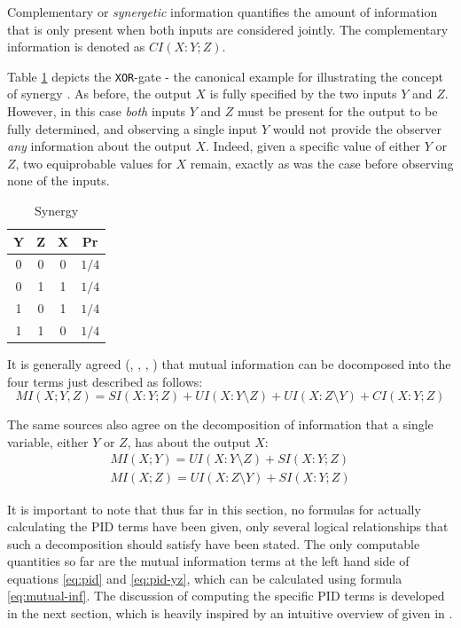 \documentclass[12pt]{article}
\begin{document}
Complementary or \textit{synergetic} information quantifies the amount of information that is only present when both inputs are considered jointly. The complementary information is denoted as $CI(X:Y;Z)$. 

Table \ref{table:3} depicts the \texttt{XOR}-gate - the canonical example for illustrating the concept of synergy \cite{pid-synergy}. As before, the output $X$ is fully specified by the two inputs $Y$ and $Z$. However, in this case \textit{both} inputs $Y$ and $Z$ must be present for the output to be fully determined, and observing a single input $Y$ would not provide the observer \textit{any} information about the output $X$. Indeed, given a specific value of either $Y$ or $Z$, two equiprobable values for $X$ remain, exactly as was the case before observing none of the inputs. 

\begin{table}[h!]
\centering
\begin{tabular}{|c c |c|c|}
	\hline
	Y & Z & X & Pr\\ 
	\hline
	0 & 0 & 0 & $1/4$ \\
	0 & 1 & 1 & $1/4$ \\ 
	1 & 0 & 1 & $1/4$ \\ 
	1 & 1 & 0 & $1/4$ \\ 
	\hline
\end{tabular}
\caption{Synergy}
\label{table:3}
\end{table}

It is generally agreed (\cite{williams-beer}, \cite{bertschinger}, \cite{pid-redundant}, \cite{pid-synergy}) that mutual information can be docomposed into the four terms just described as follows:
\begin{equation}
MI(X;Y,Z) = SI(X:Y;Z) + UI(X:Y \setminus Z) + UI(X:Z \setminus Y) + CI(X:Y;Z)
\label{eq:pid}
\end{equation}

The same sources also agree on the decomposition of information that a single variable, either $Y$ or $Z$, has about the output $X$: 
\begin{equation}
\begin{split}
MI(X;Y) = UI(X:Y \setminus Z) + SI(X:Y;Z) \\
MI(X;Z) = UI(X:Z \setminus Y) + SI(X:Y;Z)
\label{eq:pid-yz}
\end{split}
\end{equation}

It is important to note that thus far in this section, no formulas for actually calculating the PID terms have been given, only several logical relationships that such a decomposition should satisfy have been stated. The only computable quantities so far are the mutual information terms at the left hand side of equations \ref{eq:pid} and \ref{eq:pid-yz}, which can be calculated using formula \ref{eq:mutual-inf}. The discussion of computing the specific PID terms is developed in the next section, which is heavily inspired by an intuitive overview of \cite{bertschinger} given in \cite{pid-goal-functions}. 
\end{document}
